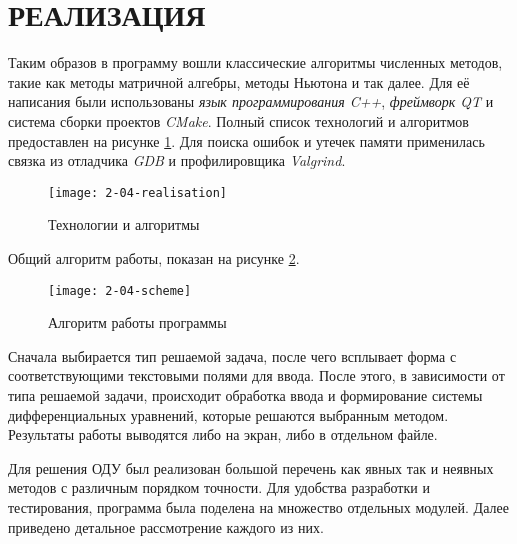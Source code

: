 \section{РЕАЛИЗАЦИЯ}


Таким образов в программу вошли классические алгоритмы численных методов, такие как методы матричной алгебры, методы
Ньютона и так далее. Для её написания были использованы \textit{язык программирования C++}, \textit{фреймворк QT} и система сборки
проектов \textit{CMake}. Полный список технологий и алгоритмов предоставлен на рисунке \ref{fig:stack}.
Для поиска ошибок и утечек памяти применилась связка из отладчика \textit{GDB} и профилировщика \textit{Valgrind}. 

\begin{figure}
    \texttt{[image: 2-04-realisation]}
    \caption{Технологии и алгоритмы}
    \label{fig:stack}
\end{figure}

Общий алгоритм работы, показан на рисунке \ref{fig:sheme}.

\begin{figure}
    \texttt{[image: 2-04-scheme]}
    \caption{Алгоритм работы программы}
    \label{fig:sheme}
\end{figure}

Сначала выбирается тип решаемой задача, после чего всплывает форма с соответствующими текстовыми полями для ввода. После этого, в
зависимости от типа решаемой задачи, происходит обработка ввода и формирование системы дифференциальных уравнений, которые решаются
выбранным методом. Результаты работы выводятся либо на экран, либо в отдельном файле.

Для решения ОДУ был реализован большой перечень как явных так и неявных методов с различным порядком точности. Для удобства разработки
и тестирования, программа была поделена на множество отдельных модулей. Далее приведено детальное рассмотрение каждого из них.




